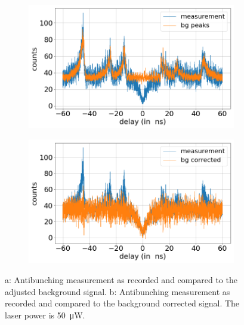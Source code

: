 \begin{figure}[H]
    \centering
    \begin{subfigure}{0.47\textwidth}
        \centering
        \includegraphics[width=1.0\textwidth]{img/output_t2/50.0muW_bg_peaks.png}
    		\caption{}
    \end{subfigure}
    \begin{subfigure}{0.47\textwidth}
        \centering
        \includegraphics[width=\textwidth]{img/output_t2/50.0muW_bg_vgl.png}
        \caption{}
    \end{subfigure}
    \caption{a: Antibunching measurement as recorded and compared to the adjusted background signal. b: Antibunching measurement as recorded and compared to the background corrected signal. The laser power is \SI{50}{\micro W}.} %
\end{figure}
